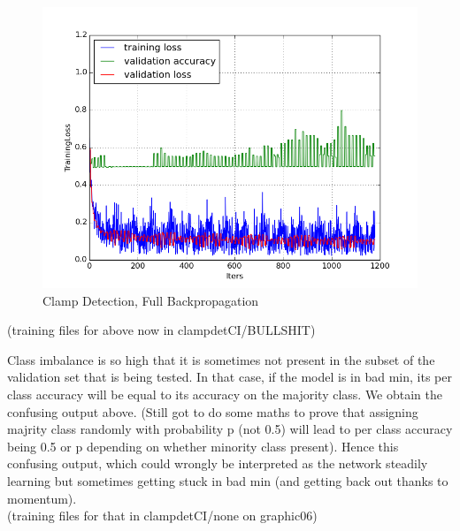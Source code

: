 \documentclass[a4paper,11pt]{article}
\begin{document}
\begin{figure}[h!]
	\centering
	\includegraphics[scale=0.5]{images/plot_clampdetCI_none_testrun.png}
	\caption{Clamp Detection, Full Backpropagation}
\end{figure}

(training files for above now in clampdetCI/BULLSHIT)

Class imbalance is so high that it is sometimes not present in the subset of the validation set that is being tested. In that case, if the model is in bad min, its per class accuracy will be equal to its accuracy on the majority class. We obtain the confusing output above. (Still got to do some maths to prove that assigning majrity class randomly with probability p (not 0.5) will lead to per class accuracy being 0.5 or p depending on whether minority class present). Hence this confusing output, which could wrongly be interpreted as the network steadily learning but sometimes getting stuck in bad min (and getting back out thanks to momentum). \\



(training files for that in clampdetCI/none on graphic06)
\end{document}
